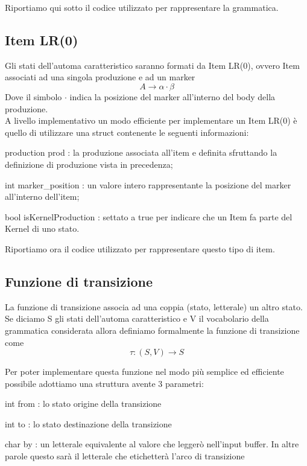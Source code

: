 \documentclass[12pt]{article}
\begin{document}
Riportiamo qui sotto il codice utilizzato per rappresentare la grammatica.




\subsection{Item LR(0)}
Gli stati dell'automa caratteristico saranno formati da Item LR(0), ovvero Item associati ad una singola produzione e ad un marker
$$
A \to \alpha\cdot\beta
$$ 
Dove il simbolo $\cdot$ indica la posizione del marker all'interno del body della produzione. \\

A livello implementativo un modo efficiente per implementare un Item LR(0) è quello di utilizzare una struct contenente le seguenti informazioni:
\begin{list}{-}{}
\item production prod : la produzione associata all'item e definita sfruttando la definizione di produzione vista in precedenza;
\item int marker\_position : un valore intero rappresentante la posizione del marker all'interno dell'item;
\item bool isKernelProduction : settato a true per indicare che un Item fa parte del Kernel di uno stato.
\end{list}

Riportiamo ora il codice utilizzato per rappresentare questo tipo di item.


\subsection{Funzione di transizione}
La funzione di transizione associa ad una coppia (stato, letterale) un altro stato. Se diciamo S gli stati dell'automa caratteristico e V il vocabolario della grammatica considerata allora definiamo formalmente la funzione di transizione come
$$
\tau \colon (S, V) \to S
$$

Per poter implementare questa funzione nel modo più semplice ed efficiente possibile adottiamo una struttura avente 3 parametri:
\begin{list}{-}{}
\item int from : lo stato origine della transizione
\item int to : lo stato destinazione della transizione
\item char by : un letterale equivalente al valore che leggerò nell'input buffer. In altre parole questo sarà il letterale che etichetterà l'arco di transizione 
\end{list}
\end{document}
